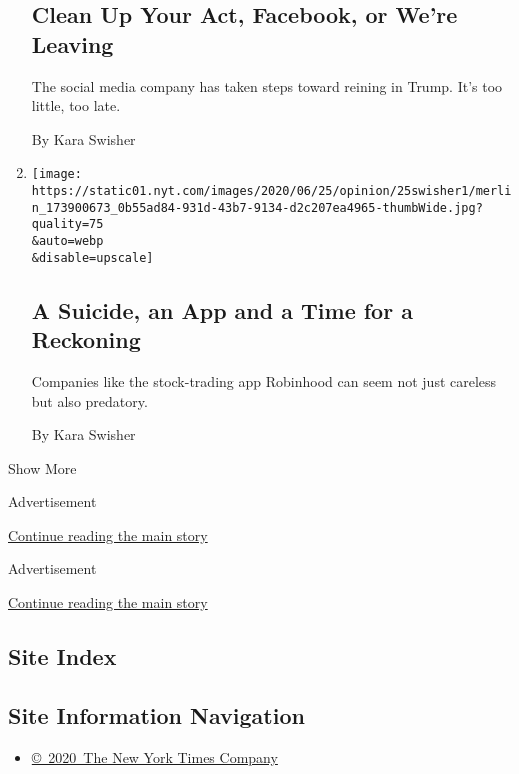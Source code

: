 \begin{enumerate}
  \hypertarget{clean-up-your-act-facebook-or-were-leaving}{%
  \subsection{Clean Up Your Act, Facebook, or We're
  Leaving}\label{clean-up-your-act-facebook-or-were-leaving}}

  The social media company has taken steps toward reining in Trump. It's
  too little, too late.

  By Kara Swisher
\item
  \href{/2020/06/25/opinion/robinhood-suicide-trading.html}{}

  \texttt{[image: https://static01.nyt.com/images/2020/06/25/opinion/25swisher1/merlin\_173900673\_0b55ad84-931d-43b7-9134-d2c207ea4965-thumbWide.jpg?quality=75\\\&auto=webp\\\&disable=upscale]}

  \hypertarget{a-suicide-an-app-and-a-time-for-a-reckoning}{%
  \subsection{A Suicide, an App and a Time for a
  Reckoning}\label{a-suicide-an-app-and-a-time-for-a-reckoning}}

  Companies like the stock-trading app Robinhood can seem not just
  careless but also predatory.

  By Kara Swisher
\end{enumerate}

Show More

Advertisement

\protect\hyperlink{after-mid1}{Continue reading the main story}

Advertisement

\protect\hyperlink{after-mktg}{Continue reading the main story}

\hypertarget{site-index}{%
\subsection{Site Index}\label{site-index}}

\hypertarget{site-information-navigation}{%
\subsection{Site Information
Navigation}\label{site-information-navigation}}

\begin{itemize}
\tightlist
\item
  \href{https://help.nytimes.com/hc/en-us/articles/115014792127-Copyright-notice}{©~2020~The
  New York Times Company}
\end{itemize}

